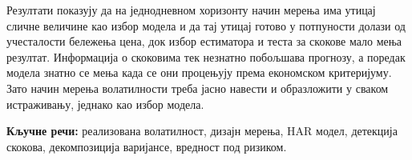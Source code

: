 \documentclass[12pt,a4paper,oneside]{report}
\begin{document}
Резултати показују да на једнодневном хоризонту начин мерења има утицај сличне величине
као избор модела и да тај утицај готово у потпуности долази од учесталости бележења
цена, док избор естиматора и теста за скокове мало мења резултат. Информација о
скоковима тек незнатно побољшава прогнозу, а поредак модела знатно се мења када се они
процењују према економском критеријуму. Зато начин мерења волатилности треба јасно
навести и образложити у сваком истраживању, једнако као избор модела.

\vspace{1em}
\noindent\textbf{Кључне речи:} реализована волатилност, дизајн мерења, HAR модел,
детекција скокова, декомпозиција варијансе, вредност под ризиком.

\renewcommand{\contentsname}{САДРЖАЈ}
\begin{singlespace}
\tableofcontents
\end{singlespace}

\clearpage
{}
\setcounter{page}{1}







\printbibliography[heading=bibintoc,title={ЛИТЕРАТУРА}]


\end{document}

